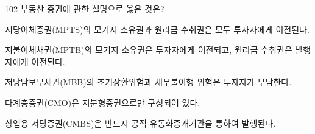 \begin{question}{102}
부동산 증권에 관한 설명으로 옳은 것은?
\begin{choices}
  \item 저당이체증권(MPTS)의 모기지 소유권과 원리금 수취권은 모두 투자자에게 이전된다.
  \item 지불이체채권(MPTB)의 모기지 소유권은 투자자에게 이전되고, 원리금 수취권은 발행자에게 이전된다.
  \item 저당담보부채권(MBB)의 조기상환위험과 채무불이행 위험은 투자자가 부담한다.
  \item 다계층증권(CMO)은 지분형증권으로만 구성되어 있다.
  \item 상업용 저당증권(CMBS)은 반드시 공적 유동화중개기관을 통하여 발행된다.
\end{choices}
\end{question}
